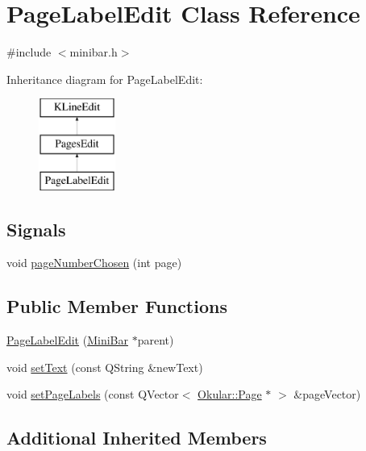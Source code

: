 \hypertarget{classPageLabelEdit}{\section{Page\+Label\+Edit Class Reference}
\label{classPageLabelEdit}
}


{\ttfamily \#include $<$minibar.\+h$>$}

Inheritance diagram for Page\+Label\+Edit\+:\begin{figure}[H]
\begin{center}
\leavevmode
\includegraphics[height=3.000000cm]{classPageLabelEdit}
\end{center}
\end{figure}
\subsection*{Signals}
\begin{DoxyCompactItemize}
\item 
void \hyperlink{classPageLabelEdit_ab8a670a9718ff90f27e54e3e73ad4443}{page\+Number\+Chosen} (int page)
\end{DoxyCompactItemize}
\subsection*{Public Member Functions}
\begin{DoxyCompactItemize}
\item 
\hyperlink{classPageLabelEdit_aaaff284d99edf500647f9f9cba79d04b}{Page\+Label\+Edit} (\hyperlink{classMiniBar}{Mini\+Bar} $\ast$parent)
\item 
void \hyperlink{classPageLabelEdit_ad2157902bf48e9c2db62045ec9e13f05}{set\+Text} (const Q\+String \&new\+Text)
\item 
void \hyperlink{classPageLabelEdit_a98491407e83f10e7a2b7bec9051d36c1}{set\+Page\+Labels} (const Q\+Vector$<$ \hyperlink{classOkular_1_1Page}{Okular\+::\+Page} $\ast$ $>$ \&page\+Vector)
\end{DoxyCompactItemize}
\subsection*{Additional Inherited Members}


